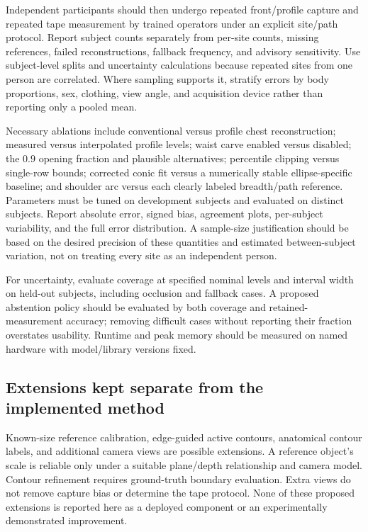 Independent participants should then undergo repeated front/profile capture and repeated tape measurement by trained operators under an explicit site/path protocol. Report subject counts separately from per-site counts, missing references, failed reconstructions, fallback frequency, and advisory sensitivity. Use subject-level splits and uncertainty calculations because repeated sites from one person are correlated. Where sampling supports it, stratify errors by body proportions, sex, clothing, view angle, and acquisition device rather than reporting only a pooled mean.

Necessary ablations include conventional versus profile chest reconstruction; measured versus interpolated profile levels; waist carve enabled versus disabled; the $0.9$ opening fraction and plausible alternatives; percentile clipping versus single-row bounds; corrected conic fit versus a numerically stable ellipse-specific baseline; and shoulder arc versus each clearly labeled breadth/path reference. Parameters must be tuned on development subjects and evaluated on distinct subjects. Report absolute error, signed bias, agreement plots, per-subject variability, and the full error distribution. A sample-size justification should be based on the desired precision of these quantities and estimated between-subject variation, not on treating every site as an independent person.

For uncertainty, evaluate coverage at specified nominal levels and interval width on held-out subjects, including occlusion and fallback cases. A proposed abstention policy should be evaluated by both coverage and retained-measurement accuracy; removing difficult cases without reporting their fraction overstates usability. Runtime and peak memory should be measured on named hardware with model/library versions fixed.

\subsection{Extensions kept separate from the implemented method}
Known-size reference calibration, edge-guided active contours, anatomical contour labels, and additional camera views are possible extensions. A reference object's scale is reliable only under a suitable plane/depth relationship and camera model. Contour refinement requires ground-truth boundary evaluation. Extra views do not remove capture bias or determine the tape protocol. None of these proposed extensions is reported here as a deployed component or an experimentally demonstrated improvement.

